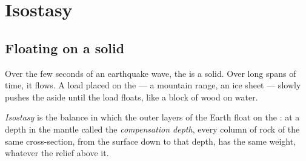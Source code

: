 \section{Isostasy}

\subsection{Floating on a solid}

Over the few seconds of an earthquake wave, the  is a solid. Over
long spans of time, it flows. A load placed on the  --- a mountain
range, an ice sheet --- slowly pushes the  aside until the load
floats, like a block of wood on water.

\begin{definition}\label{def:g11:lithosphere-asthenosphere:isostasy}
\emph{Isostasy} is the balance in which the outer layers of
the Earth float on the : at a depth in the mantle called the
\emph{compensation depth}, every column of rock of
the same cross-section, from the surface down to that depth, has the same
weight, whatever the relief above it.
\end{definition}


